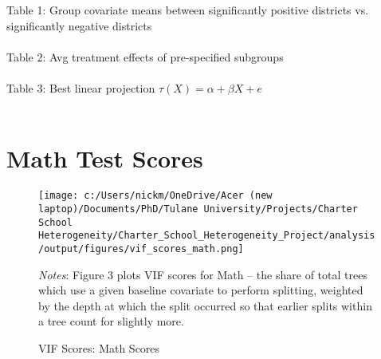 \documentclass{article} %
\begin{document}
	

Table 1: Group covariate means between significantly positive districts vs. significantly negative districts\\
\\


Table 2: Avg treatment effects of pre-specified subgroups\\
\\

Table 3: Best linear projection $\tau(X) = \alpha + \beta X + e$\\
\\




	\section{Math Test Scores}

\begin{figure}[H]
\centering
\texttt{[image: c:/Users/nickm/OneDrive/Acer (new laptop)/Documents/PhD/Tulane University/Projects/Charter School Heterogeneity/Charter\_School\_Heterogeneity\_Project/analysis/output/figures/vif\_scores\_math.png]}
\caption{VIF Scores: Math Scores}
\label{fig:image3}
\begin{minipage}{1\linewidth}
\singlespacing
\footnotesize
\emph{Notes}: Figure 3 plots VIF scores for Math -- the share of total trees which use a given baseline covariate to perform splitting, weighted by the depth at which the split occurred so that earlier splits within a tree count for slightly more.  
\end{minipage}
\end{figure}
\end{document}
